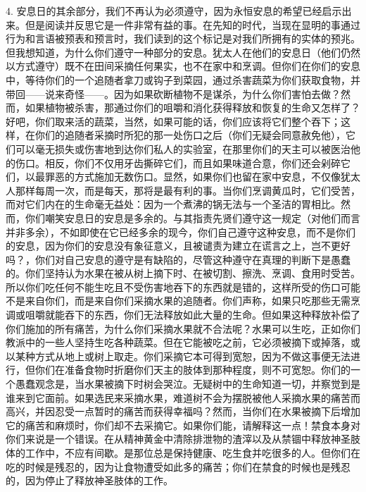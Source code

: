 4. 安息日的其余部分，我们不再认为必须遵守，因为永恒安息的希望已经启示出来。但是阅读并反思它是一件非常有益的事。在先知的时代，当现在显明的事通过行为和言语被预表和预言时，我们读到的这个标记是对我们所拥有的实体的预兆。但我想知道，为什么你们遵守一种部分的安息。犹太人在他们的安息日（他们仍然以方式遵守）既不在田间采摘任何果实，也不在家中和烹调。但你们在你们的安息中，等待你们的一个追随者拿刀或钩子到菜园，通过杀害蔬菜为你们获取食物，并带回——说来奇怪——。因为如果砍断植物不是谋杀，为什么你们害怕去做？然而，如果植物被杀害，那通过你们的咀嚼和消化获得释放和恢复的生命又怎样了？好吧，你们取来活的蔬菜，当然，如果可能的话，你们应该将它们整个吞下；这样，在你们的追随者采摘时所犯的那一处伤口之后（你们无疑会同意赦免他），它们可以毫无损失或伤害地到达你们私人的实验室，在那里你们的天主可以被医治他的伤口。相反，你们不仅用牙齿撕碎它们，而且如果味道合意，你们还会剁碎它们，以最罪恶的方式施加无数伤口。显然，如果你们也留在家中安息，不仅像犹太人那样每周一次，而是每天，那将是最有利的事。当你们烹调黄瓜时，它们受苦，而对它们内在的生命毫无益处：因为一个煮沸的锅无法与一个圣洁的胃相比。然而，你们嘲笑安息日的安息是多余的。与其指责先贤们遵守这一规定（对他们而言并非多余），不如即使在它已经多余的现今，你们自己遵守这种安息，而不是你们的安息，因为你们的安息没有象征意义，且被谴责为建立在谎言之上，岂不更好吗？，你们对自己安息的遵守是有缺陷的，尽管这种遵守在真理的判断下是愚蠢的。你们坚持认为水果在被从树上摘下时、在被切割、擦洗、烹调、食用时受苦。所以你们吃任何不能生吃且不受伤害地吞下的东西就是错的，这样所受的伤口可能不是来自你们，而是来自你们采摘水果的追随者。你们声称，如果只吃那些无需烹调或咀嚼就能吞下的东西，你们无法释放如此大量的生命。但如果这种释放补偿了你们施加的所有痛苦，为什么你们采摘水果就不合法呢？水果可以生吃，正如你们教派中的一些人坚持生吃各种蔬菜。但在它能被吃之前，它必须被摘下或掉落，或以某种方式从地上或树上取走。你们采摘它本可得到宽恕，因为不做这事便无法进行，但你们在准备食物时折磨你们天主的肢体到那种程度，则不可宽恕。你们的一个愚蠢观念是，当水果被摘下时树会哭泣。无疑树中的生命知道一切，并察觉到是谁来到它面前。如果选民来采摘水果，难道树不会为摆脱被他人采摘水果的痛苦而高兴，并因忍受一点暂时的痛苦而获得幸福吗？然而，当你们在水果被摘下后增加它的痛苦和麻烦时，你们却不去采摘它。如果你们能，请解释这一点！禁食本身对你们来说是一个错误。在从精神黄金中清除排泄物的渣滓以及从禁锢中释放神圣肢体的工作中，不应有间歇。是那位总是保持健康、吃生食并吃很多的人。但你们在吃的时候是残忍的，因为让食物遭受如此多的痛苦；你们在禁食的时候也是残忍的，因为停止了释放神圣肢体的工作。\par

